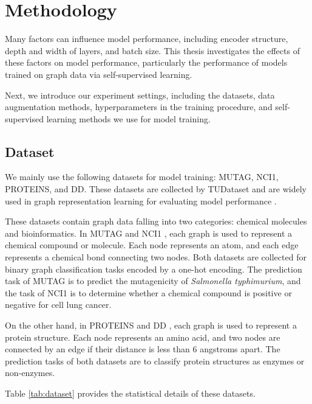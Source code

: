 
\section{Methodology}\label{sec:3}

Many factors can influence model performance, including encoder structure, depth and width of layers, and batch size. This thesis investigates the effects of these factors on model performance, particularly the performance of models trained on graph data via self-supervised learning. 

Next, we introduce our experiment settings, including the datasets, data augmentation methods, hyperparameters in the training procedure, and self-supervised learning methods we use for model training.


\subsection{Dataset}


We mainly use the following datasets for model training: MUTAG, NCI1, PROTEINS, and DD. These datasets are collected by TUDataset \cite{tudataset} and are widely used in graph representation learning for evaluating model performance \cite{benchmarking}. 

These datasets contain graph data falling into two categories: chemical molecules and bioinformatics. In MUTAG \cite{mutag} and NCI1 \cite{nci1}, each graph is used to represent a chemical compound or molecule. Each node represents an atom, and each edge represents a chemical bond connecting two nodes. Both datasets are collected for binary graph classification tasks encoded by a one-hot encoding. The prediction task of MUTAG is to predict the mutagenicity of \textit{Salmonella typhimurium}, and the task of NCI1 is to determine whether a chemical compound is positive or negative for cell lung cancer.


On the other hand, in PROTEINS \cite{proteins} and DD \cite{proteins}, each graph is used to represent a protein structure. Each node represents an amino acid, and two nodes are connected by an edge if their distance is less than 6 angstroms apart. The prediction tasks of both datasets are to classify protein structures as enzymes or non-enzymes.


Table \ref{tab:dataset} provides the statistical details of these datasets.


